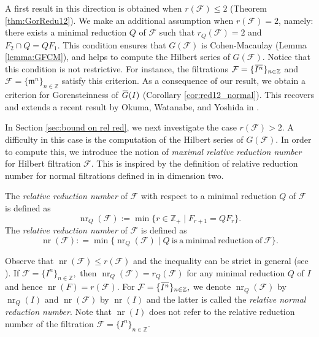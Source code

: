 \documentclass[12pt]{amsart}
\theoremstyle{definition}
\theoremstyle{remark}
\numberwithin{equation}{section}
\newcommand{\bbZ}{\ensuremath{\mathbb Z}}
\newcommand{\m}{{\mathfrak m}}
\DeclareMathOperator{\nr}{{nr}}
\newcommand{\FF}{\mathcal{F}}
\newcommand{\ol}[1]{\mkern 1.5mu\overline{\mkern-1.5mu#1\mkern-1.5mu}\mkern 1.5mu} %
\begin{document}
\par 
A first result in this direction is obtained when $r(\FF) \leq 2$ 
(Theorem \ref{thm:GorRedu12}). 
We make an additional assumption when $r(\FF)=2$, namely: 
there exists a minimal reduction $Q$ of $\FF$ such that $r_Q(\FF)=2$ 
and $F_2 \cap Q = QF_1.$ This condition ensures that $G(\FF)$ is 
Cohen-Macaulay (Lemma \ref{lemma:GFCM}), 
and helps to compute the Hilbert series of $G(\FF)$.  
Notice that this condition is not restrictive. 
For instance, the filtrations $\FF=\{\ol{I^n}\}_{n \in \bbZ}$ 
and $\FF=\{\m^n\}_{n \in \bbZ}$ satisfy this criterion.
As a consequence of our result, we obtain a criterion 
for Gorensteinness of $\ol{G}(I)$ (Corollary \ref{cor:red12_normal}). 
This recovers and extends a recent result by Okuma, Watanabe, 
and Yoshida in \cite{OWY6}.


\par 
In Section \ref{sec:bound on rel red}, 
we next investigate the case $r(\FF) >2$.  
A difficulty in this case is the computation of the Hilbert series of 
$G(\FF)$.  
In order to compute this, we introduce   
the notion of {\it maximal relative reduction number}
for Hilbert filtration $\FF$.  
This is inspired by the definition of relative reduction number 
for normal filtrations defined in \cite{OWY2019} in dimension two. 
\par
The {\it relative reduction number} of $\FF$ with respect to a minimal
reduction $Q$ of $\FF$ is defined as
\[
\nr_Q(\mathcal{F}):=\min \{r\in \mathbb{Z}_+\mid F_{r+1}=QF_r \}.
\]
The {\it relative reduction number} of $\FF$ is defined as
\[
\nr(\FF): = \min\{\nr_Q(\FF) 
\mid Q ~\mathrm{is ~a ~minimal ~reduction ~of} ~\FF \}.
\] 
\par 
Observe that $\nr(\FF) \leq r(\FF)$ and the inequality can be strict 
in general (see \cite[Example 2.8]{ORWY2022}).  
If $\mathcal{F}=\{I^n\}_{n \in \bbZ},$ then $\nr_Q(\FF) =r_Q(\FF)$ 
for any minimal reduction $Q$ of $I$ and hence $\nr(F)=r(\FF)$. 
For $\FF=\{\ol{I^n}\}_{n\in \mathbb{Z}},$ we denote $\nr_Q(\FF)$ 
by ${\nr}_Q(I)$ and $\nr(\FF)$ by ${\nr}(I)$ 
and the latter is called the {\it  relative normal reduction number}.
Note that $\nr(I)$ does not refer to the relative reduction number of the filtration $\mathcal{F}=\{I^n\}_{n \in \bbZ}$.
\end{document}
